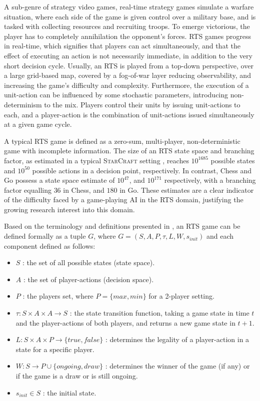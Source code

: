 \documentclass[conference]{IEEEtran}
\begin{document}
A sub-genre of strategy video games, real-time strategy games simulate a warfare situation, where each side of the game is given control over a military base, and is tasked with collecting resources and recruiting troops. To emerge victorious, the player has to completely annihilation the opponent's forces. RTS games progress in real-time, which signifies that players can act simultaneously, and that the effect of executing an action is not necessarily immediate, in addition to the very short decision cycle. Usually, an RTS is played from a top-down perspective, over a large grid-based map, covered by a fog-of-war layer reducing observability, and increasing the game's difficulty and complexity. Furthermore, the execution of a unit-action can be influenced by some stochastic parameters, introducing non-determinism to the mix. Players control their units by issuing unit-actions to each, and a player-action is the combination of unit-actions issued simultaneously at a given game cycle.

A typical RTS game is defined as a zero-sum, multi-player, non-deterministic game with incomplete information. The size of an RTS state space and branching factor, as estimated in a typical \textsc{StarCraft} setting \cite{ontanon_survey_2013}, reaches $10^{1685}$ possible states and $10^{50}$ possible actions in a decision point, respectively. In contrast, Chess and Go possess a state space estimate of $10^{47}$, and $10^{171}$ respectively, with a branching factor equalling $36$ in Chess, and $180$ in Go. These estimates are a clear indicator of the difficulty faced by a game-playing AI in the RTS domain, justifying the growing research interest into this domain.

Based on the terminology and definitions presented in \cite{ontanon_combinatorial_2017}, an RTS game can be defined formally as a tuple $G$, where $G = (S, A, P, \tau, L, W, s_{init})$ and each component defined as follows:

\begin{itemize}
\item $S$ : the set of all possible states (state space).
\item $A$ : the set of player-actions (decision space).
\item $P$ : the players set, where $P=\{max,min\}$ for a 2-player setting.
\item $\tau : S \times A \times A \rightarrow S$ : the state transition function, taking a game state in time $t$ and the player-actions of both players, and returns a new game state in $t+1$.
\item $L: S \times A \times P \rightarrow \{true,false\}$ : determines the legality of a player-action in a state for a specific player.
\item $W: S \rightarrow P \cup \{ongoing,draw\}$ : determines the winner of the game (if any) or if the game is a draw or is still ongoing.
\item $s_{init} \in S$ : the initial state.
\end{itemize}
\end{document}
